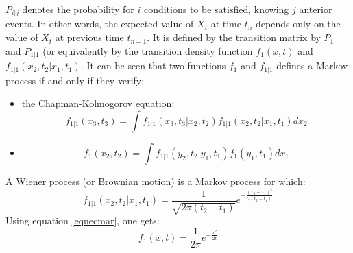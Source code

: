 \documentclass[12pt]{book}
\begin{document}
$P_{i|j}$ denotes the probability for $i$ conditions to be satisfied,
knowing $j$ anterior events.
In other words, the expected value of $X_t$ at time $t_n$ depends only
on the value of $X_t$ at previous time $t_{n-1}$. It is defined by the
transition matrix by $P_1$ and $P_{1|1}$ (or
equivalently by the transition density function $f_1(x,t)$ and 
$f_{1|1}(x_2,t_2|x_1,t_1)$.
It can be seen \cite{ma:stoch:VanKampen81} that two functions $f_1$ and $f_{1|1}$
defines a Markov process if and only if they verify:
\begin{itemize}
\item the Chapman-Kolmogorov equation:
\begin{equation}
f_{1|1}(x_3,t_3)=\int f_{1|1}(x_3,t_3|x_2,t_2)f_{1|1}(x_2,t_2|x_1,t_1)
dx_2
\end{equation}

\item 
\begin{equation}
\label{eqnecmar}
f_1(x_2,t_2)=\int f_{1|1}(y_2,t_2|y_1,t_1)f_1(y_1,t_1)dx_1
\end{equation}
\end{itemize}
A Wiener process (or
Brownian motion) is a Markov process for which: 
\begin{equation}
f_{1|1}(x_2,t_2|x_1,t_1)= \frac{1}{\sqrt{2\pi
(t_2-t_1)}}e^{-\frac{(x_2-x_1)^2}{2(t_2-t_1)}} 
\end{equation}
Using equation \ref{eqnecmar}, one gets:
\begin{equation}
f_1(x,t)=\frac{1}{2\pi}e^{-\frac{x^2}{2t}}
\end{equation}
\end{document}
